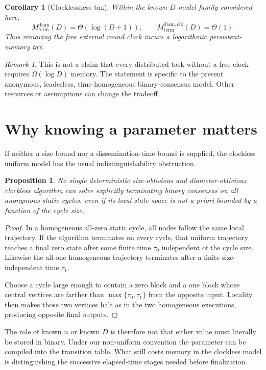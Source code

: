 \documentclass[11pt]{article}
\newtheorem{proposition}{Proposition}
\newtheorem{corollary}{Corollary}
\theoremstyle{remark}
\newtheorem{remark}{Remark}
\begin{document}
\begin{corollary}[Clocklessness tax]
Within the known-$D$ model family considered here,
\[
M_{\mathrm{term}}^{\mathrm{diam}}(D)=\Theta(\log(D+1)),
\qquad
M_{\mathrm{term}}^{\mathrm{diam,clk}}(D)=\Theta(1).
\]
Thus removing the free external round clock incurs a logarithmic persistent-memory tax.
\end{corollary}

\begin{remark}
This is not a claim that every distributed task without a free clock requires $\Omega(\log D)$ memory. The statement is specific to the present anonymous, leaderless, time-homogeneous binary-consensus model. Other resources or assumptions can change the tradeoff.
\end{remark}

\section{Why knowing a parameter matters}
If neither a size bound nor a dissemination-time bound is supplied, the clockless uniform model has the usual indistinguishability obstruction.

\begin{proposition}
No single deterministic size-oblivious and diameter-oblivious clockless algorithm can solve explicitly terminating binary consensus on all anonymous static cycles, even if its local state space is not a priori bounded by a function of the cycle size.
\end{proposition}
\begin{proof}
In a homogeneous all-zero static cycle, all nodes follow the same local trajectory. If the algorithm terminates on every cycle, that uniform trajectory reaches a final zero state after some finite time $\tau_0$ independent of the cycle size. Likewise the all-one homogeneous trajectory terminates after a finite size-independent time $\tau_1$.

Choose a cycle large enough to contain a zero block and a one block whose central vertices are farther than $\max\{\tau_0,\tau_1\}$ from the opposite input. Locality then makes those two vertices halt as in the two homogeneous executions, producing opposite final outputs.
\end{proof}

The role of known $n$ or known $D$ is therefore not that either value must literally be stored in binary. Under our non-uniform convention the parameter can be compiled into the transition table. What still costs memory in the clockless model is distinguishing the successive elapsed-time stages needed before finalization.
\end{document}
